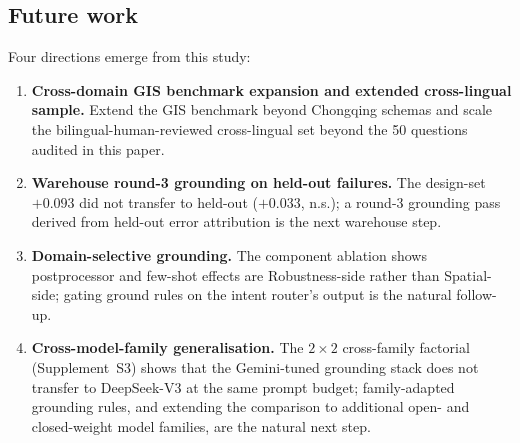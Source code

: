 \documentclass[11pt]{article}
\begin{document}
\subsection{Future work}

Four directions emerge from this study:
\begin{enumerate}[leftmargin=*]
  \item \textbf{Cross-domain GIS benchmark expansion and extended cross-lingual sample.} Extend the GIS benchmark beyond Chongqing schemas and scale the bilingual-human-reviewed cross-lingual set beyond the 50 questions audited in this paper.
  \item \textbf{Warehouse round-3 grounding on held-out failures.} The design-set $+0.093$ did not transfer to held-out ($+0.033$, n.s.); a round-3 grounding pass derived from held-out error attribution is the next warehouse step.
  \item \textbf{Domain-selective grounding.} The component ablation shows postprocessor and few-shot effects are Robustness-side rather than Spatial-side; gating ground rules on the intent router's output is the natural follow-up.
  \item \textbf{Cross-model-family generalisation.} The $2{\times}2$ cross-family factorial (Supplement~S3) shows that the Gemini-tuned grounding stack does not transfer to DeepSeek-V3 at the same prompt budget; family-adapted grounding rules, and extending the comparison to additional open- and closed-weight model families, are the natural next step.
\end{enumerate}

\end{document}
